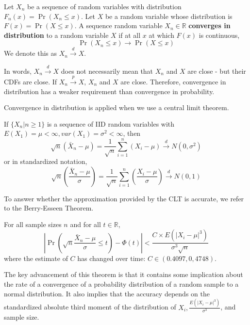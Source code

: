 \begin{mdframed}[backgroundcolor=blue!5] 
\begin{definition}
Let $X_n$ be a sequence of random variables with distribution $F_n(x)=\Pr(X_n\leq x)$. Let $X$ be a random variable whose distribution is $F(x)=\Pr(X\leq x)$. A sequence random variable $X_n\in \mathbb{R}$ \textbf{converges in distribution} to a random variable $X$ if at all $x$ at which $F(x)$ is continuous, 
\[
\Pr(X_n\leq x)\to \Pr(X\leq x)
\]
We denote this as $X_n\xrightarrow{d}X$. 
\end{definition}
\end{mdframed}\par
In words, $X_n\xrightarrow{d}X$ does not necessarily mean that $X_n$ and $X$ are close - but their CDFs are close. If $X_n\xrightarrow{p}X$, $X_n$ and $X$ are close. Therefore, convergence in distribution has a weaker requirement than convergence in probability.\par
Convergence in distribution is applied when we use a central limit theorem. 
\begin{mdframed}[backgroundcolor=green!5] 
\begin{theorem}
If $\{X_n|n\geq1\}$ is a sequence of IID random variables with $E(X_1)=\mu<\infty, var(X_1)=\sigma^2<\infty$, then
\footnotesize{\[
\sqrt{n}(\bar{X}_n-\mu)=\frac{1}{\sqrt{n}}\sum_{i=1}^n(X_i-\mu)\xrightarrow{d}N(0,\sigma^2) 
\]}\normalsize or in standardized notation,
\footnotesize{\[
\sqrt{n}\left(\frac{\bar{X}_n-\mu}{\sigma}\right)=\frac{1}{\sqrt{n}}\sum_{i=1}^n\left(\frac{X_i-\mu}{\sigma}\right)\xrightarrow{d}N(0,1) 
\]}\normalsize
\end{theorem}
\end{mdframed}
\par
To answer whether the approximation provided by the CLT is accurate, we refer to the Berry-Esseen Theorem.
\begin{mdframed}[backgroundcolor=green!5] 
\begin{theorem}
For all sample sizes $n$ and for all $t\in\mathbb{R}$, 
\footnotesize{\[
\left|\Pr\left(\sqrt{n}\frac{\bar{X}_n-\mu}{\sigma}\leq t\right)-\Phi(t)\right|<\frac{C\times E(|X_i-\mu|^3)}{\sigma^3\sqrt{n}}
\]}\normalsize
where the estimate of $C$ has changed over time: $C\in(0.4097, 0,4748)$. 
\end{theorem}
\end{mdframed}\par
The key advancement of this theorem is that it contains some implication about the rate of a convergence of a probability distribution of a random sample to a normal distribution. It also implies that the accuracy depends on the standardized absolute third moment of the distribution of $X_i, \frac{E(|X_i-\mu|^3)}{\sigma^3}$, and sample size. \par
